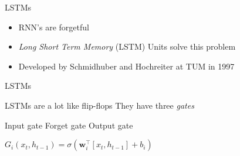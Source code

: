 \begin{slide}{LSTMs}
  \begin{itemize}
    \item<1-> RNN's are forgetful
    \item<2-> \emph{Long Short Term Memory} (LSTM) Units solve this problem
    \item<3-> Developed by Schmidhuber and Hochreiter at TUM in 1997
  \end{itemize}
\end{slide}


\begin{slide}{LSTMs}
  \begin{itemize}
    \pitem LSTMs are a lot like flip-flops
    \pitem They have three \emph{gates}
    \begin{itemize}
      \pitem Input gate
      \pitem Forget gate
      \pitem Output gate
    \end{itemize}
  \end{itemize}
  \vspace{0.5cm}
  \pause
  $G_i(x_t, h_{t-1}) = \sigma(\mathbf{w}_i^\top [x_t, h_{t-1}] + b_i)$
\end{slide}

